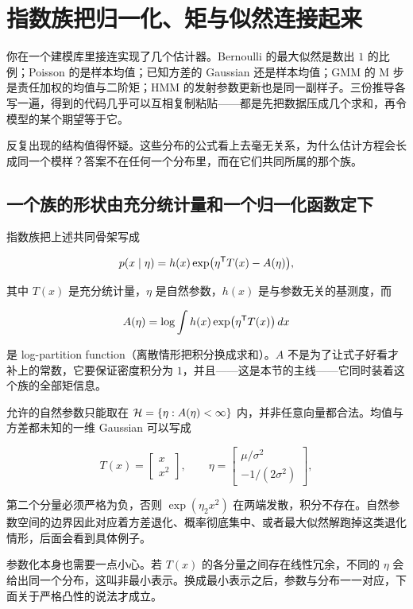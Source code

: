 \section{指数族把归一化、矩与似然连接起来}
\label{sec:13-Machine-Learning/06-Probabilistic-Models/06}

你在一个建模库里接连实现了几个估计器。Bernoulli 的最大似然是数出 \(1\) 的比例；Poisson 的是样本均值；已知方差的 Gaussian 还是样本均值；GMM 的 M 步是责任加权的均值与二阶矩；HMM 的发射参数更新也是同一副样子。三份推导各写一遍，得到的代码几乎可以互相复制粘贴——都是先把数据压成几个求和，再令模型的某个期望等于它。

反复出现的结构值得怀疑。这些分布的公式看上去毫无关系，为什么估计方程会长成同一个模样？答案不在任何一个分布里，而在它们共同所属的那个族。

\subsection{一个族的形状由充分统计量和一个归一化函数定下}

指数族把上述共同骨架写成

\[
p(x\mid\eta)=h(x)\exp\bigl(\eta^{\mathsf{T}}T(x)-A(\eta)\bigr),
\]

其中 \(T(x)\) 是充分统计量，\(\eta\) 是自然参数，\(h(x)\) 是与参数无关的基测度，而

\[
A(\eta)=\log\int h(x)\exp\bigl(\eta^{\mathsf{T}}T(x)\bigr)\,dx
\]

是 log-partition function（离散情形把积分换成求和）。\(A\) 不是为了让式子好看才补上的常数，它要保证密度积分为 \(1\)，并且——这是本节的主线——它同时装着这个族的全部矩信息。

允许的自然参数只能取在 \(\mathcal H=\left\{\eta:A(\eta)<\infty\right\}\) 内，并非任意向量都合法。均值与方差都未知的一维 Gaussian 可以写成

\[
T(x)=\begin{bmatrix}x\\x^2\end{bmatrix},
\qquad
\eta=\begin{bmatrix}\mu/\sigma^2\\-1/(2\sigma^2)\end{bmatrix},
\]

第二个分量必须严格为负，否则 \(\exp(\eta_2x^2)\) 在两端发散，积分不存在。自然参数空间的边界因此对应着方差退化、概率彻底集中、或者最大似然解跑掉这类退化情形，后面会看到具体例子。

参数化本身也需要一点小心。若 \(T(x)\) 的各分量之间存在线性冗余，不同的 \(\eta\) 会给出同一个分布，这叫非最小表示。换成最小表示之后，参数与分布一一对应，下面关于严格凸性的说法才成立。

